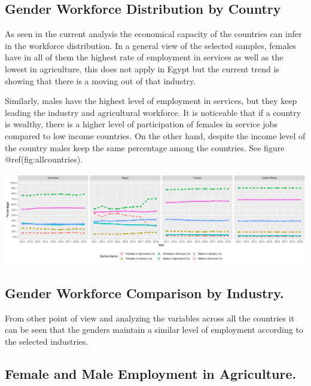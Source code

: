 \documentclass[
]{article}
\begin{document}
\hypertarget{gender-workforce-distribution-by-country}{%
\subsection{Gender Workforce Distribution by
Country}\label{gender-workforce-distribution-by-country}}

As seen in the current analysis the economical capacity of the countries
can infer in the workforce distribution. In a general view of the
selected samples, females have in all of them the highest rate of
employment in services as well as the lowest in agriculture, this does
not apply in Egypt but the current trend is showing that there is a
moving out of that industry.

Similarly, males have the highest level of employment in services, but
they keep leading the industry and agricultural workforce. It is
noticeable that if a country is wealthy, there is a higher level of
participation of females in service jobs compared to low income
countries. On the other hand, despite the income level of the country
males keep the same percentage among the countries. See figure
@ref(fig:allcountries).

\includegraphics{The_Outsiders_5513_files/figure-latex/allcountries-1.pdf}

\hypertarget{gender-workforce-comparison-by-industry.}{%
\subsection{Gender Workforce Comparison by
Industry.}\label{gender-workforce-comparison-by-industry.}}

From other point of view and analyzing the variables across all the
countries it can be seen that the genders maintain a similar level of
employment according to the selected industries.

\hypertarget{female-and-male-employment-in-agriculture.}{%
\subsection{Female and Male Employment in
Agriculture.}\label{female-and-male-employment-in-agriculture.}}
\end{document}
